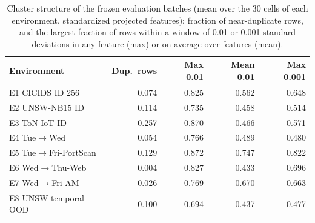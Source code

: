 \begin{table}[!t]
\caption{Cluster structure of the frozen evaluation batches (mean over the 30 cells of each environment, standardized projected features): fraction of near-duplicate rows, and the largest fraction of rows within a window of 0.01 or 0.001 standard deviations in any feature (max) or on average over features (mean).}
\label{tab:s-mass}
\centering
\scriptsize
\setlength{\tabcolsep}{3pt}
\begin{tabular}{@{}lrrrr@{}}
\toprule
Environment & Dup.\ rows & Max 0.01 & Mean 0.01 & Max 0.001 \\
\midrule
E1 CICIDS ID 256 & 0.074 & 0.825 & 0.562 & 0.648 \\
E2 UNSW-NB15 ID & 0.114 & 0.735 & 0.458 & 0.514 \\
E3 ToN-IoT ID & 0.257 & 0.870 & 0.466 & 0.571 \\
E4 Tue$\to$Wed & 0.054 & 0.766 & 0.489 & 0.480 \\
E5 Tue$\to$Fri-PortScan & 0.129 & 0.872 & 0.747 & 0.822 \\
E6 Wed$\to$Thu-Web & 0.004 & 0.827 & 0.433 & 0.696 \\
E7 Wed$\to$Fri-AM & 0.026 & 0.769 & 0.670 & 0.663 \\
E8 UNSW temporal OOD & 0.100 & 0.694 & 0.437 & 0.477 \\
\bottomrule
\end{tabular}
\end{table}

